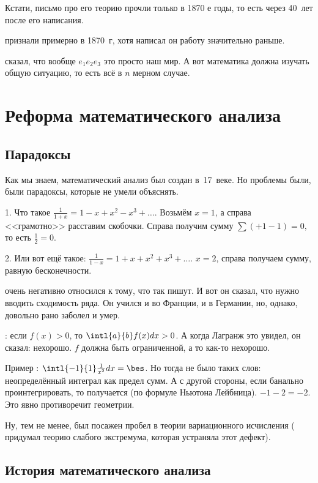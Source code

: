 \documentclass[a4paper,oneside,fleqn,10pt]{article}
\begin{document}
Кстати, письмо  про его теорию прочли только в 1870 е
годы, то есть через 40~лет 
после его написания.

 признали примерно в 1870~г, хотя
написал он работу значительно раньше.

 сказал, что вообще $e_1 e_2 e_3$ это просто наш мир. А
вот математика должна изучать общую ситуацию, то есть всё в $n$ мерном
случае.

\section{Реформа математического анализа}

\subsection{Парадоксы}

Как мы знаем, математический анализ был создан в~17~веке. Но проблемы
были, были парадоксы, которые не умели объяснять.

1. Что такое $\frac{1}{1+x} = 1 -x + x^2 -x^3 +\dots$.  Возьмём $x =
1$, а справа <<грамотно>> расставим скобочки.  Справа получим сумму
$\sum (+1 -1) = 0,$ то есть $\frac{1}{2} = 0$.

2. Или вот ещё такое: $\frac{1}{1-x} = 1 + x + x^2 + x^3 + \dots$.  $x
= 2$, справа получаем сумму, равную бесконечности.

 очень негативно относился к тому, что так пишут. И вот он
сказал, что нужно вводить сходимость ряда. Он учился и во Франции, и в
Германии, но, однако, довольно рано заболел и умер.

: если $f(x) > 0$, то $\intl{a}{b} f(x) dx > 0$.  А
когда Лагранж это увидел, он сказал: нехорошо. $f$ должна быть
ограниченной, а то как-то нехорошо.

Пример : $\intl{-1}{1} \frac{1}{x^2}dx =
\bes$.  Но тогда не было таких слов: неопределённый интеграл как
предел сумм.  А с другой стороны, если банально проинтегрировать, то
получается (по формуле Ньютона Лейбница).  $-1-2 = -2$. Это явно
противоречит геометрии.

Ну, тем не менее, был посажен пробел в теории вариационного исчисления
( придумал теорию слабого экстремума, которая устраняла
этот дефект).

\subsection{История математического анализа}
\end{document}
